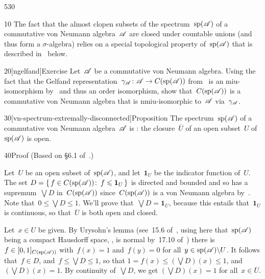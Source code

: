 \begin{parsec}{530}%
\begin{point}{10}%
The fact that the almost clopen subsets
of the spectrum~$\mathrm{sp}(\mathscr{A})$
of a commutative von Neumann algebra~$\mathscr{A}$
are closed under countable unions
(and thus form a $\sigma$-algebra)
relies on a special topological property of~$\mathrm{sp}(\mathscr{A})$
that is described in~ below.
\end{point}
\begin{point}{20}[ngelfand]{Exercise}%
Let~$\mathscr{A}$ be a commutative von Neumann algebra.
Using the fact that
the Gelfand representation~$\gamma_{\mathscr{A}}\colon \mathscr{A}\to C(\mathrm{sp}(\mathscr{A}))$
from~
is an miu-isomorphism 
by~
and thus an order isomorphism,
show that~$C(\mathrm{sp}(\mathscr{A}))$
is a commutative von Neumann algebra
that is nmiu-isomorphic
to~$\mathscr{A}$ via~$\gamma_{\mathscr{A}}$.
\end{point}
\begin{point}{30}[vn-spectrum-extremally-disconnected]{Proposition}%
The spectrum~$\mathrm{sp}(\mathscr{A})$
of a commutative von Neumann algebra~$\mathscr{A}$
is :%
the closure~$\overline{U}$
of an open subset~$U$ of~$\mathrm{sp}(\mathscr{A})$
is open.
\begin{point}{40}{Proof}%
(Based on \S6.1 of~\cite{riesz}.)

Let~$U$ be an open subset of~$\mathrm{sp}(\mathscr{A})$,
and let~$\mathbf{1}_U$ be the indicator function
of~$U$.
The set $D=\{\,f\in C(\mathrm{sp}(\mathscr{A}))\colon\, f\leqslant \mathbf{1}_U\,\}$
is directed and bounded 
and so has a supremum~$\bigvee D$
in~$C(\mathrm{sp}(\mathscr{A}))$
since~$C(\mathrm{sp}(\mathscr{A}))$ is a von Neumann algebra by~.
Note that~$0\leq \bigvee D\leq 1$.
We'll prove that~$\bigvee D = \mathbf{1}_{\overline{U}}$,
because this entails
that~$\mathbf{1}_{\overline{U}}$
is continuous,  so that~$\overline{U}$ is both open and closed.

Let~$x\in U$ be given.
By Urysohn's lemma (see~15.6 of~\cite{willard},
using here that~$\mathrm{sp}(\mathscr{A})$ being a compact Hausdorff
space, , 
is normal by~17.10 of~\cite{willard})
there is $f\in [0,1]_{C(\mathrm{sp}(\mathscr{A}))}$
with~$f(x)=1$ and~$f(y)=0$ for all~$y\in \mathrm{sp}(\mathscr{A})\backslash U$.
It follows that~$f\in D$,
and~$f\leq \bigvee D\leq 1$,
so that $1=f(x)\leq (\bigvee D)(x)\leq 1$,
and~$(\bigvee D)(x)=1$.
By continuity of~$\bigvee D$,
we get $(\bigvee D)(x)=1$ for all~$x\in \overline{U}$.


\end{point}
\end{point}
\end{parsec}
